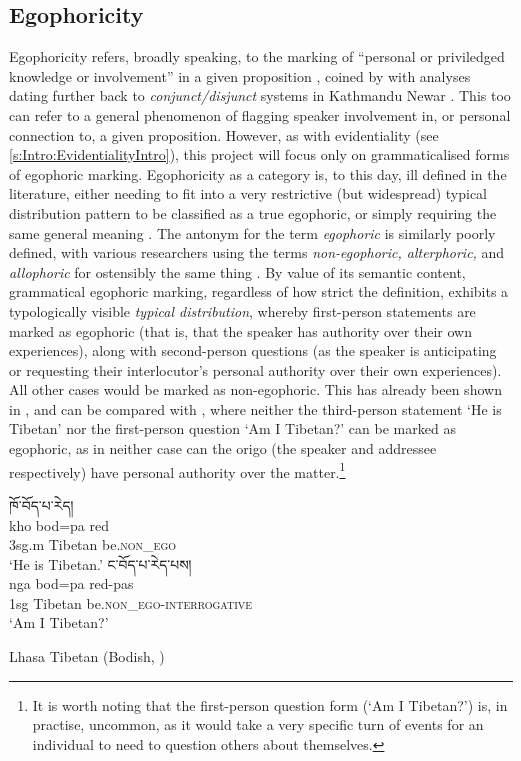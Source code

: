 \subsection{Egophoricity}\label{s:Intro:EgophoricityIntro}
Egophoricity refers, broadly speaking, to the marking of ``personal or priviledged knowledge or involvement'' in a given proposition \cite[2]{EgoIntro}, coined by  with analyses dating further back to \textit{conjunct/disjunct} systems in Kathmandu Newar \cite[Newaric: Nepal, ][]{HaleNewar1980}. This too can refer to a general phenomenon of flagging speaker involvement in, or personal connection to, a given proposition. However, as with evidentiality (see \ref{s:Intro:EvidentialityIntro}), this project will focus only on grammaticalised forms of egophoric marking. Egophoricity as a category is, to this day, ill defined in the literature, either needing to fit into a very restrictive (but widespread) typical distribution pattern to be classified as a true egophoric, or simply requiring the same general meaning \cites{EgoIntro}{Gawne2017}. The antonym for the term \textit{egophoric} is similarly poorly defined, with various researchers using the terms \textit{non-egophoric, alterphoric,} and \textit{allophoric} for ostensibly the same thing \cite{Widmer2020}. By value of its semantic content, grammatical egophoric marking, regardless of how strict the definition, exhibits a typologically visible \textit{typical distribution}, whereby first-person statements are marked as egophoric (that is, that the speaker has authority over their own experiences), along with second-person questions (as the speaker is anticipating or requesting their interlocutor's personal authority over their own experiences). All other cases would be marked as non-egophoric. This has already been shown in , and can be compared with , where neither the third-person statement `He is Tibetan' nor the first-person question `Am I Tibetan?' can be marked as egophoric, as in neither case can the origo (the speaker and addressee respectively) have personal authority over the matter.\footnote{It is worth noting that the first-person question form (`Am I Tibetan?') is, in practise, uncommon, as it would take a very specific turn of events for an individual to need to question others about themselves.}

\begin{exe}
\ex\label{ex:EgoDistribution}
\begin{xlist}
\ex 
\glll \texttibetan{ཁོ་བོད་པ་རེད།} \\
kho bod=pa red \\
3sg.m Tibetan be.\textsc{non\_ego} \\
\glt `He is Tibetan.'
\ex 
\glll \texttibetan{ང་བོད་པ་རེད་པས།} \\
nga bod=pa red-pas \\
1sg Tibetan be.\textsc{non\_ego}-\textsc{interrogative} \\
\glt `Am I Tibetan?'
\end{xlist}
Lhasa Tibetan (Bodish, \tibetnat) \cite[394]{DeLancey2017Tibetan}
\end{exe}

